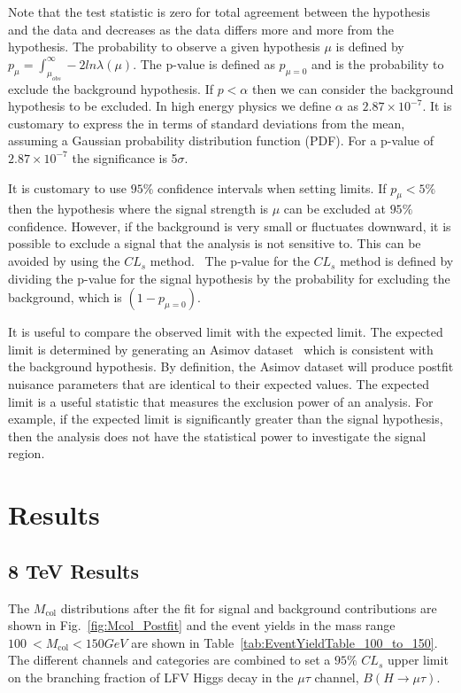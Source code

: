 \documentclass[oneside, letterpaper, oldfontcommands]{memoir}
\begin{document}
\qquad Note that the test statistic is zero for total agreement between the hypothesis and the data and decreases as the data differs more and more from the hypothesis. The probability to observe a given hypothesis $\mu$ is defined by $p_{\mu} = \int_{\mu_{obs}}^{\infty} - 2 ln \lambda(\mu)$. The p-value is defined as $p_{\mu=0}$ and is the probability to exclude the background hypothesis. If $p<\alpha$ then we can consider the background hypothesis to be excluded. In high energy physics we define $\alpha$ as $2.87 \times 10^{-7}$. It is customary to express the in terms of standard deviations from the mean, assuming a Gaussian probability distribution function (PDF). For a p-value of $2.87 \times 10^{-7}$ the significance is 5$\sigma$. 

\qquad It is customary to use $95\%$ confidence intervals when setting limits. If $p_{\mu} < 5\%$ then the hypothesis where the signal strength is $\mu$ can be excluded at $95\%$ confidence. However, if the background is very small or fluctuates downward, it is possible to exclude a signal that the analysis is not sensitive to. This can be avoided by using the $CL_{s}$ method.~\cite{Read:451614} The p-value for the $CL_{s}$ method is defined by dividing the p-value for the signal hypothesis by the probability for excluding the background, which is $(1-p_{\mu=0})$.

\qquad It is useful to compare the observed limit with the expected limit. The expected limit is determined by generating an Asimov dataset~\cite{Cowan:2010js} which is consistent with the background hypothesis. By definition, the Asimov dataset will produce postfit nuisance parameters that are identical to their expected values. The expected limit is a useful statistic that measures the exclusion power of an analysis. For example, if the expected limit is significantly greater than the signal hypothesis, then the analysis does not have the statistical power to investigate the signal region. 
\section{Results}
\subsection{8 TeV Results}
The $M_\text{col}$ distributions after the fit for signal and background contributions are shown in Fig.~\ref{fig:Mcol_Postfit} and the
event yields in the mass range $100\:  < M_\text{col} < 150GeV$ are shown in Table~\ref{tab:EventYieldTable_100_to_150}.
The different channels and categories are combined  to set a $95\%$ $CL_{s}$  upper limit on the branching
fraction of LFV Higgs decay in the  $\mu \tau$ channel, $B(H\rightarrow\mu\tau)$.
\end{document}
